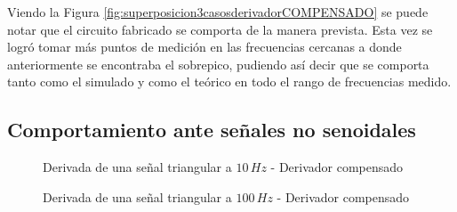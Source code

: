 Viendo la Figura \ref{fig:superposicion3casosderivadorCOMPENSADO} se puede notar que el circuito fabricado se comporta de la manera prevista. Esta vez se logró tomar más puntos de medición en las frecuencias cercanas a donde anteriormente se encontraba el sobrepico, pudiendo así decir que se comporta tanto como el simulado y como el teórico en todo el rango de frecuencias medido.

\subsection{Comportamiento ante señales no senoidales}

\begin{figure}[H]
	\begin{center}
		\caption{Derivada de una señal triangular a $10 \,Hz$ - Derivador compensado}
		\label{fig:derivtriangCOMP10Hz}
	\end{center}
\end{figure}

\begin{figure}[H]
	\begin{center}
		\caption{Derivada de una señal triangular a $100 \,Hz$ - Derivador compensado}
		\label{fig:derivtriangCOMP100Hz}
	\end{center}
\end{figure}


